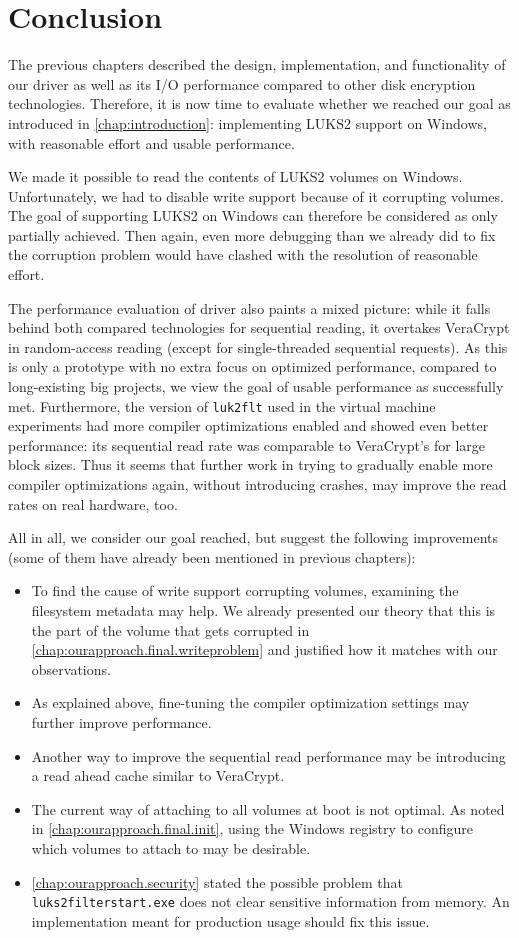 \chapter{Conclusion}
\label{chap:conclusion}
The previous chapters described the design, implementation, and functionality of our driver as well as its I/O performance compared to other disk encryption technologies. Therefore, it is now time to evaluate whether we reached our goal as introduced in \autoref{chap:introduction}: implementing LUKS2 support on Windows, with reasonable effort and usable performance.

We made it possible to read the contents of LUKS2 volumes on Windows. Unfortunately, we had to disable write support because of it corrupting volumes. The goal of supporting LUKS2 on Windows can therefore be considered as only partially achieved. Then again, even more debugging than we already did to fix the corruption problem would have clashed with the resolution of reasonable effort.

The performance evaluation of driver also paints a mixed picture: while it falls behind both compared technologies for sequential reading, it overtakes VeraCrypt in random-access reading (except for single-threaded sequential requests). As this is only a prototype with no extra focus on optimized performance, compared to long-existing big projects, we view the goal of usable performance as successfully met. Furthermore, the version of \texttt{luk2flt} used in the virtual machine experiments had more compiler optimizations enabled and showed even better performance: its sequential read rate was comparable to VeraCrypt's for large block sizes. Thus it seems that further work in trying to gradually enable more compiler optimizations again, without introducing crashes, may improve the read rates on real hardware, too.

All in all, we consider our goal reached, but suggest the following improvements (some of them have already been mentioned in previous chapters):
\begin{itemize}
	\item To find the cause of write support corrupting volumes, examining the filesystem metadata may help. We already presented our theory that this is the part of the volume that gets corrupted in \autoref{chap:ourapproach.final.writeproblem} and justified how it matches with our observations.
	\item As explained above, fine-tuning the compiler optimization settings may further improve performance.
	\item Another way to improve the sequential read performance may be introducing a read ahead cache similar to VeraCrypt.
	\item The current way of attaching to all volumes at boot is not optimal. As noted in \autoref{chap:ourapproach.final.init}, using the Windows registry to configure which volumes to attach to may be desirable.
	\item \autoref{chap:ourapproach.security} stated the possible problem that \texttt{luks2filterstart.exe} does not clear sensitive information from memory. An implementation meant for production usage should fix this issue.
\end{itemize}

